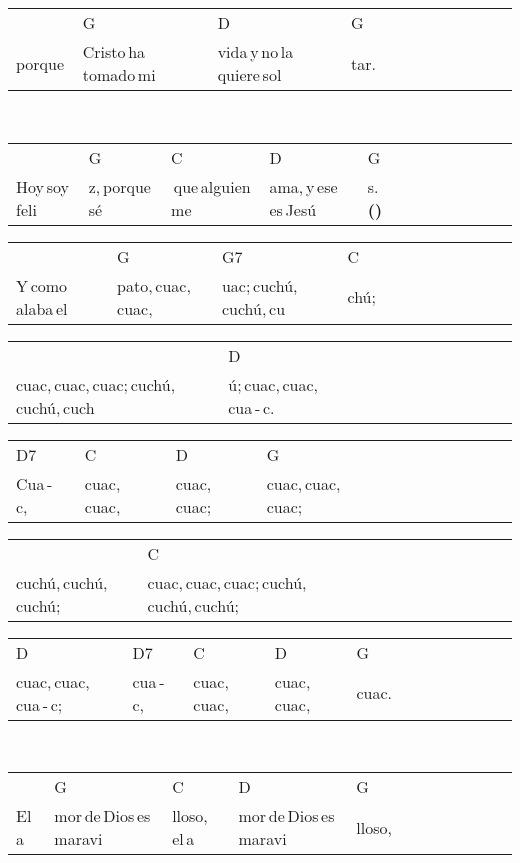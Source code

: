 \begin{multicols}{2}
\begin{minipage}{\columnwidth}
\noindent
\begin{tabular}{llllllllllll}
&G&D&G\\
porque\,&Cristo\,ha\,tomado\,mi\,&vida\,y\,no\,la\,quiere\,sol&tar.
\end{tabular}
\end{minipage}\\

\noindent
\begin{minipage}{\columnwidth}
\noindent
\noindent
\begin{tabular}{llllllllllll}
&G&C&D&G\\
Hoy\,soy\,feli&z,\,porque\,sé&\,que\,alguien\,me\,&ama,\,y\,ese\,es\,Jesú&s.\,\,\textbf{(\texttimes2)}
\end{tabular}

\noindent
\begin{tabular}{llllllllllll}
&G&G7&C\\
Y\,como\,alaba\,el\,&pato,\,cuac,\,cuac,\,&uac;\,cuchú,\,cuchú,\,cu&chú;
\end{tabular}

\noindent
\begin{tabular}{llllllllllll}
&D\\
cuac,\,cuac,\,cuac;\,cuchú,\,cuchú,\,cuch&ú;\,cuac,\,cuac,\,cua\,-\,c.
\end{tabular}

\noindent
\begin{tabular}{llllllllllll}
D7&C&D&G\\
Cua\,-\,c,\,&cuac,\,cuac,\,&cuac,\,cuac;\,&cuac,\,cuac,\,cuac;
\end{tabular}

\noindent
\begin{tabular}{llllllllllll}
&C\\
cuchú,\,cuchú,\,cuchú;\,&cuac,\,cuac,\,cuac;\,cuchú,\,cuchú,\,cuchú;
\end{tabular}

\noindent
\begin{tabular}{llllllllllll}
D&D7&C&D&G\\
cuac,\,cuac,\,cua\,-\,c;\,&cua\,-\,c,\,&cuac,\,cuac,\,&cuac,\,cuac,\,&cuac.
\end{tabular}
\end{minipage}\\

\noindent
\begin{minipage}{\columnwidth}
\noindent
\noindent
\begin{tabular}{llllllllllll}
&G&C&D&G\\
El\,a&mor\,de\,Dios\,es\,maravi&lloso,\,el\,a&mor\,de\,Dios\,es\,maravi&lloso,
\end{tabular}


\end{minipage}
\end{multicols}
